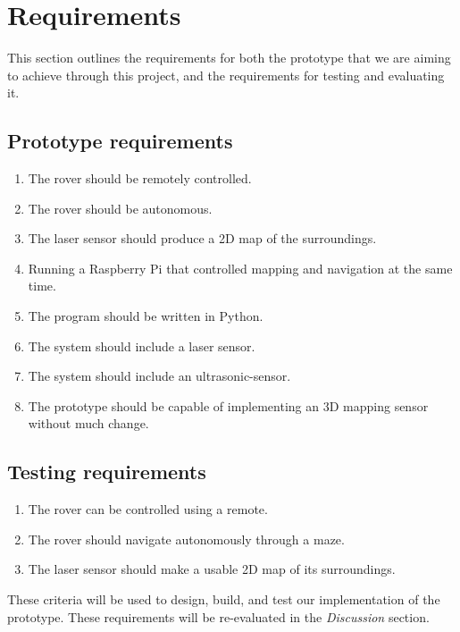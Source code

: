 \section{Requirements}

This section outlines the requirements for both the prototype that we are aiming to achieve through this project, and the requirements for testing and evaluating it.

\subsection{Prototype requirements}

\begin{enumerate}
	
	\item The rover should be remotely controlled.
	\item The rover should be autonomous.
	\item The laser sensor should produce a 2D map of the surroundings.
	\item Running a Raspberry Pi that controlled mapping and navigation at the same time.
	\item The program should be written in Python.
	\item The system should include a laser sensor.
	\item The system should include an ultrasonic-sensor.
 	\item The prototype should be capable of implementing an 3D mapping sensor without much change.
	
\end{enumerate}

\subsection{Testing requirements}

\begin{enumerate}
	
	\item The rover can be controlled using a remote.
	\item The rover should navigate autonomously through a maze.
	\item The laser sensor should make a usable 2D map of its surroundings.
	
\end{enumerate}

These criteria will be used to design, build, and test our implementation of the prototype. These requirements will be re-evaluated in the \textit{Discussion} section.
